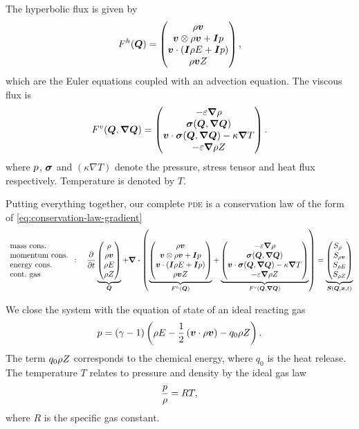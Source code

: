 \newcommand{\viscFluxDef}{
  \begin{pmatrix}
     -\diffCoeff \gradient{\Qrho}\\
     \stressT (\Q, \gradQ)  \\
     \Qv \cdot \stressT (\Q, \gradQ) - \kappa \gradient{T}\\
     -\diffCoeff \gradient{\QZ}
   \end{pmatrix}
}

The hyperbolic flux is given by
\begin{equation}
  \label{eq:hyper-flux}
  F^{h}(\bm{Q}) = \begin{pmatrix} \rho \bm{v} \\ \bm{v} \otimes \rho \bm{v} + \bm{I} p \\ \bm{v} \cdot (\bm{I} \rho E + \bm{I} p) \\ \rho \bm{v} Z \end{pmatrix},
\end{equation}
which are the Euler equations coupled with an advection equation.
The viscous flux is
\begin{equation}
  \label{eq:visc-flux}
  \viscFlux(\Q, \gradQ) = \viscFluxDef.
\end{equation}
where $p$, $\bm{\sigma}$ and $(\kappa \nabla T)$ denote the pressure, stress tensor and heat flux respectively.
Temperature is denoted by $T$.


Putting everything together, our complete \textsc{pde} is a conservation law of the form of \cref{eq:conservation-law-gradient}
\begin{equation}
 \begin{array}{l}
 \text{mass cons.} \\
 \text{momentum cons.} \\
 \text{energy cons.} \\
 \text{cont.\ gas} 
\end{array}
:
\quad
  \pdv{}{t}
  \underbrace{
  \begin{pmatrix}
    \Qrho\\
    \Qj\\
    \QE\\
    \QZ
    \end{pmatrix}}_{\Q}
  + 
  \divergence{
  \left(
   \underbrace{\hyperFluxDef}_{\hyperFlux(\Q)}
+
\underbrace{\viscFluxDef}_{\viscFlux(\Q, \gradQ)}
  \right)}
 =
  \underbrace{
  \begin{pmatrix}
    S_{\Qrho\phantom{\Qrho}}\\
    S_{\Qj}\\
    S_{\QE}\\
    S_{\QZ}
    \end{pmatrix}}_{\source(\Q, \bm{x}, t)}
\end{equation}

We close the system with the equation of state of an ideal reacting gas
\begin{equation}
  \label{eq:eos}
  p = (\gamma - 1) \left(\rho E - \frac{1}{2} \left(\bm{v} \cdot \rho \bm{v} \right)  - q_0 \rho Z \right).
\end{equation}
The term $q_0 \rho Z$ corresponds to the chemical energy, where $q_0$ is the heat release.
The temperature $T$ relates to pressure and density by the ideal gas law
\begin{equation}
  \label{eq:temperature}
 \frac{p}{\rho} = RT,
\end{equation}
where $R$ is the specific gas constant.

